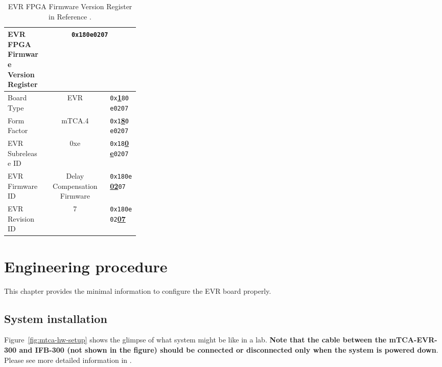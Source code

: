 \documentclass[11pt
  , a4paper
  , article
  , oneside
  , showtrims
]{memoir}
\begin{document}
\begin{table}[!htb]
  \centering
  \begin{tabular}{p{0.3\linewidth}|c|l}
    \toprule
    EVR FPGA Firmware Version Register              & \multicolumn{2}{c}{\texttt{0x180e0207}}             \\\midrule
    Board Type        & EVR                         &  \texttt{0x}\underline{\textbf{1}}\texttt{80e0207}  \\\midrule
    Form Factor       & mTCA.4                      &  \texttt{0x1}\underline{\textbf{8}}\texttt{0e0207}  \\\midrule
    EVR Subrelease ID & 0xe                         &  \texttt{0x18}\underline{\textbf{0e}}\texttt{0207}  \\\midrule
    EVR Firmware ID   & Delay Compensation Firmware &  \texttt{0x180e}\underline{\textbf{02}}\texttt{07}  \\\midrule
    EVR Revision ID   & 7                           &  \texttt{0x180e02}\underline{\textbf{07}}           \\\bottomrule
  \end{tabular}
  \caption[]{EVR FPGA Firmware Version Register in Reference \citep[see][p66]{MRFEVENTSYSTEMDC}.}
  \label{table:fwinfo}
\end{table}



\chapter{Engineering procedure}
This chapter provides the minimal information to configure the EVR board properly.\\


\section{System installation}
Figure~\ref{fig:mtca-hw-setup} shows the glimpse of what system might be like in a lab. \textbf{Note that the cable between the mTCA-EVR-300 and IFB-300 (not shown in the figure) should be connected or disconnected only when the system is powered down}. Please see more detailed information in \citep[][p54]{MRFEVENTSYSTEMDC}.\\
\end{document}
